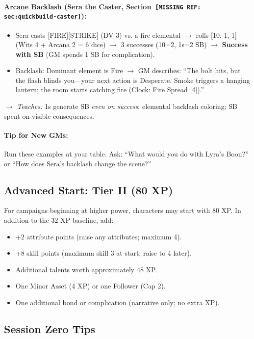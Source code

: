 \paragraph{Arcane Backlash (Sera the Caster, Section~\texttt{[MISSING REF: sec:quickbuild-caster]}):}
\begin{itemize}
  \item Sera casts [FIRE][STRIKE] (DV 3) vs. a fire elemental $\rightarrow$ rolls [10, 1, 1] (Wits 4 + Arcana 2 = 6 dice) $\rightarrow$ 3 successes (10=2, 1s=2 SB) $\rightarrow$ \textbf{Success with SB} (GM spends 1 SB for complication).
  \item Backlash: Dominant element is Fire $\rightarrow$ GM describes: ``The bolt hits, but the flash blinds you---your next action is Desperate. Smoke triggers a hanging lantern; the room starts catching fire (Clock: Fire Spread [4]).''
\end{itemize}
$\rightarrow$ \textit{Teaches:} 1s generate SB \emph{even on success}; elemental backlash coloring; SB spent on visible consequences.

\paragraph{Tip for New GMs:}
Run these examples at your table. Ask: ``What would you do with Lyra's Boon?'' or ``How does Sera's backlash change the scene?''

\subsection{Advanced Start: Tier II (80 XP)}

For campaigns beginning at higher power, characters may start with 80 XP. In addition to the 32 XP baseline, add:

\begin{itemize}
  \item +2 attribute points (raise any attributes; maximum 4).
  \item +8 skill points (maximum skill 3 at start; raise to 4 later).
  \item Additional talents worth approximately 48 XP.
  \item One Minor Asset (4 XP) or one Follower (Cap 2).
  \item One additional bond or complication (narrative only; no extra XP).
\end{itemize}

\subsection{Session Zero Tips}

